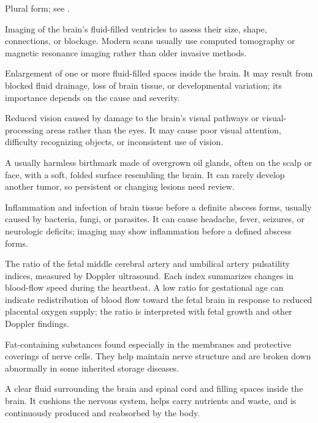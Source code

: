  Plural form; see .

 Imaging of the brain’s fluid-filled ventricles to assess their size, shape, connections, or blockage. Modern scans usually use computed tomography or magnetic resonance imaging rather than older invasive methods.

 Enlargement of one or more fluid-filled spaces inside the brain. It may result from blocked fluid drainage, loss of brain tissue, or developmental variation; its importance depends on the cause and severity.

 Reduced vision caused by damage to the brain's visual pathways or visual-processing areas rather than the eyes. It may cause poor visual attention, difficulty recognizing objects, or inconsistent use of vision.

 A usually harmless birthmark made of overgrown oil glands, often on the scalp or face, with a soft, folded surface resembling the brain. It can rarely develop another tumor, so persistent or changing lesions need review.

 Inflammation and infection of brain tissue before a definite abscess forms, usually caused by bacteria, fungi, or parasites. It can cause headache, fever, seizures, or neurologic deficits; imaging may show inflammation before a defined abscess forms.

 The ratio of the fetal middle cerebral artery and umbilical artery pulsatility indices, measured by Doppler ultrasound. Each index summarizes changes in blood-flow speed during the heartbeat. A low ratio for gestational age can indicate redistribution of blood flow toward the fetal brain in response to reduced placental oxygen supply; the ratio is interpreted with fetal growth and other Doppler findings.

 Fat-containing substances found especially in the membranes and protective coverings of nerve cells. They help maintain nerve structure and are broken down abnormally in some inherited storage diseases.

 A clear fluid surrounding the brain and spinal cord and filling spaces inside the brain. It cushions the nervous system, helps carry nutrients and waste, and is continuously produced and reabsorbed by the body.

